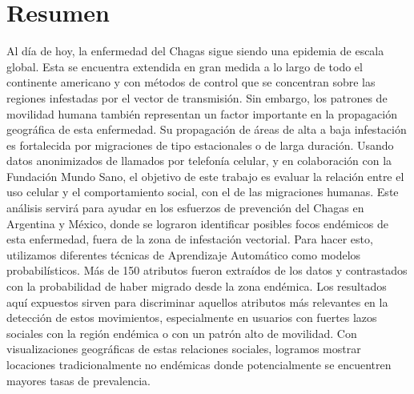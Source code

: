 \chapter{Resumen}
\label{cha:resumen}

Al día de hoy, la enfermedad del Chagas sigue siendo una epidemia de escala global. Esta se encuentra extendida en gran medida a lo largo de todo el continente americano y con métodos de control que se concentran sobre las regiones infestadas por el vector de transmisión. 
Sin embargo, los patrones de movilidad humana también representan un factor importante en la propagación geográfica de esta enfermedad. Su propagación de áreas de alta a baja infestación es fortalecida por migraciones de tipo estacionales o de larga duración. 
Usando datos anonimizados de llamados por telefonía celular, y en colaboración con la Fundación Mundo Sano, el objetivo de este trabajo es evaluar la relación entre el uso celular y el comportamiento social, con el de las migraciones humanas. Este análisis servirá para ayudar en los esfuerzos de prevención del Chagas en Argentina y México, donde se lograron identificar posibles focos endémicos de esta enfermedad, fuera de la zona de infestación vectorial. Para hacer esto, utilizamos diferentes técnicas de Aprendizaje Automático como modelos probabilísticos. Más de 150 atributos fueron extraídos de los datos y contrastados con la probabilidad de haber migrado desde la zona endémica. Los resultados aquí expuestos sirven para discriminar aquellos atributos más relevantes en la detección de estos movimientos, especialmente en usuarios con fuertes lazos sociales con la región endémica o con un patrón alto de movilidad. Con visualizaciones geográficas de estas relaciones sociales, logramos mostrar locaciones tradicionalmente no endémicas donde potencialmente se encuentren mayores tasas de prevalencia.

